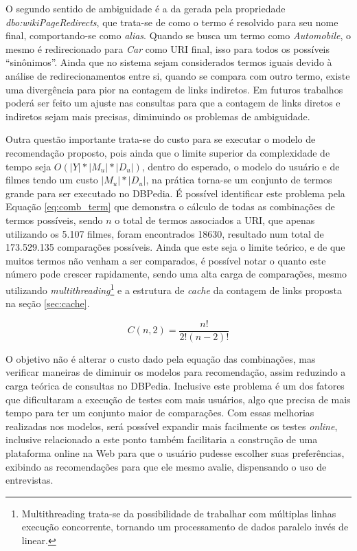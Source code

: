 O segundo sentido de ambiguidade é a da gerada pela propriedade \textit{dbo:wikiPageRedirects}, que trata-se de como o termo é resolvido para seu nome final, comportando-se como \textit{alias}. Quando se busca um termo como \textit{Automobile}, o mesmo é redirecionado para \textit{Car} como \ac{URI} final, isso para todos os possíveis \enquote{sinônimos}. Ainda que no sistema sejam considerados termos iguais devido à análise de redirecionamentos entre si, quando se compara com outro termo, existe uma divergência para pior na contagem de links indiretos. Em futuros trabalhos poderá ser feito um ajuste nas consultas para que a contagem de links diretos e indiretos sejam mais precisas, diminuindo os problemas de ambiguidade.

Outra questão importante trata-se do custo para se executar o modelo de recomendação proposto, pois ainda que o limite superior da complexidade de tempo seja $O(|Y| * |M_u| * |D_u|)$, dentro do esperado, o modelo do usuário e de filmes tendo um custo $|M_u| * |D_u|$, na prática torna-se um conjunto de termos grande para ser executado no DBPedia. É possível identificar este problema pela Equação \ref{eq:comb_term} que demonstra o cálculo de todas as combinações de termos possíveis, sendo $n$ o total de termos associados a \ac{URI}, que apenas utilizando os 5.107 filmes, foram encontrados 18630, resultado num total de 173.529.135 comparações possíveis. Ainda que este seja o limite teórico, e de que muitos termos não venham a ser comparados, é possível notar o quanto este número pode crescer rapidamente, sendo uma alta carga de comparações, mesmo utilizando \textit{multithreading}\footnote{Multithreading trata-se da possibilidade de trabalhar com múltiplas linhas execução concorrente, tornando um processamento de dados paralelo invés de linear.} e a estrutura de \textit{cache} da contagem de links proposta na seção \ref{sec:cache}.

\begin{equation}
	C(n, 2) = \frac{n!}{2!(n - 2)!}
\label{eq:comb_term}
\end{equation}

O objetivo não é alterar o custo dado pela equação das combinações, mas verificar maneiras de diminuir os modelos para recomendação, assim reduzindo a carga teórica de consultas no DBPedia. Inclusive este problema é um dos fatores que dificultaram a execução de testes com mais usuários, algo que precisa de mais tempo para ter um conjunto maior de comparações. Com essas melhorias realizadas nos modelos, será possível expandir mais facilmente os testes \textit{online}, inclusive relacionado a este ponto também facilitaria a construção de uma plataforma online na Web para que o usuário pudesse escolher suas preferências, exibindo as recomendações para que ele mesmo avalie, dispensando o uso de entrevistas.

